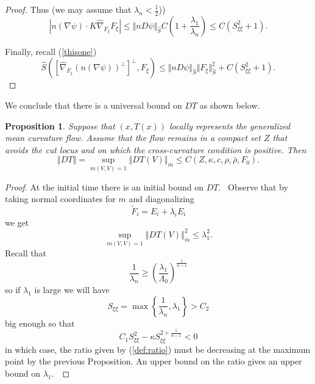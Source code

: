 \documentclass[12pt,letterpaper]{amsart}%
\newcounter{mycounter}
\numberwithin{mycounter}{section}
\theoremstyle{plain}
\newtheorem{proposition}[mycounter]{Proposition}
\numberwithin{equation}{section}
\theoremstyle{definition}
\newcommand{\maxidx}{\mathord{\xi}} %
\begin{document}
\begin{proof}
Thus (we may assume that $\lambda_n<\frac{1}{2}$))
\[
\left\vert n\left(  \nabla\psi\right)  \cdot 
K\hat{\nabla}_{F_{\maxidx}}F_{\maxidx}\right\vert
\leq
\Vert nD\psi\Vert_{\hat{S}}
C\left(  1+ \frac{\lambda_1}{\lambda_n}\right)
\leq
C\left(  S_{\maxidx\maxidx}^{2}+1\right).
\]

Finally, recall (\ref{thisone})
\[
\hat{S}\left(
\left[  \hat{\nabla}_{F_{\maxidx}}
\left(  n(\nabla\psi)\right)^{\perp}\right]^{\perp},
F_{\maxidx}\right)
\leq
\Vert nD\psi\Vert_{\hat{S}}\Vert F_{\maxidx}\Vert_{\hat{S}}^{2}
+
C\left(  S_{\maxidx\maxidx}^{2}+1\right).
\]

\end{proof}


We conclude that there is a universal bound on $DT$ as shown below.

\begin{proposition}
Suppose that $(x,T(x))$ locally represents the generalized mean curvature flow. 
Assume that the flow remains in a compact set $Z$ that avoids the cut locus and on which the cross-curvature condition is positive. 
Then \[
\left\Vert DT\right\Vert =\sup_{m(V,V)=1}\left\Vert DT(V)\right\Vert _{\bar
{m}}\leq C(Z,\kappa,c,\rho,\bar{\rho},F_{0}).
\]
\end{proposition}

\begin{proof}
At the initial time there is an initial bound on $DT.$ \ Observe that by taking
normal coordinates for $m$ and diagonalizing 
%
\[
\widetilde{F}_{i}=E_{i}+\lambda_{i}E_{\bar{\imath}}%
\]
we get \
\[
\sup_{m(V,V)=1}\left\Vert DT(V)\right\Vert _{\bar{m}}^{2}\leq\lambda_{1}^{2}.
\]
Recall that
\[
\frac{1}{\lambda_{n}}\geq\left(  \frac{\lambda_{1}}{\Lambda_{0}}\right)
^{\frac{1}{n-1}}%
\]
so if $\lambda_{1}$ is large we will have
\[
S_{\maxidx\maxidx}=\max\left\{  \frac{1}{\lambda_{n}},\lambda_{1}\right\}  >C_{2}%
\]
big enough so that
\[
C_{1}S_{\maxidx\maxidx }^{2}-\kappa S_{\maxidx\maxidx}^{2+\frac{1}{n-1}}<0
\]
in which case, the ratio given by (\ref{def:ratio}) must be decreasing at the maximum
point by the previous Proposition. An upper bound on the ratio gives an upper bound on $\lambda_1$.\ 
\end{proof}
\end{document}
